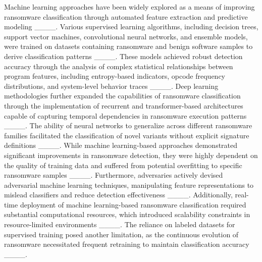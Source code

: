 Machine learning approaches have been widely explored as a means of improving ransomware classification through automated feature extraction and predictive modeling ____. Various supervised learning algorithms, including decision trees, support vector machines, convolutional neural networks, and ensemble models, were trained on datasets containing ransomware and benign software samples to derive classification patterns ____. These models achieved robust detection accuracy through the analysis of complex statistical relationships between program features, including entropy-based indicators, opcode frequency distributions, and system-level behavior traces ____. Deep learning methodologies further expanded the capabilities of ransomware classification through the implementation of recurrent and transformer-based architectures capable of capturing temporal dependencies in ransomware execution patterns ____. The ability of neural networks to generalize across different ransomware families facilitated the classification of novel variants without explicit signature definitions ____. While machine learning-based approaches demonstrated significant improvements in ransomware detection, they were highly dependent on the quality of training data and suffered from potential overfitting to specific ransomware samples ____. Furthermore, adversaries actively devised adversarial machine learning techniques, manipulating feature representations to mislead classifiers and reduce detection effectiveness ____. Additionally, real-time deployment of machine learning-based ransomware classification required substantial computational resources, which introduced scalability constraints in resource-limited environments ____. The reliance on labeled datasets for supervised training posed another limitation, as the continuous evolution of ransomware necessitated frequent retraining to maintain classification accuracy ____.